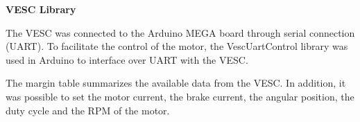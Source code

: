 \textbf{VESC Library}


The VESC was connected to the Arduino MEGA board through serial connection (UART). To facilitate the control of the motor, the VescUartControl library was used in Arduino to interface over UART with the VESC. 

The margin table summarizes the available data from the VESC. In addition, it was possible to set the motor current, the brake current, the angular position, the duty cycle and the RPM of the motor.

\hspace{1cm}

